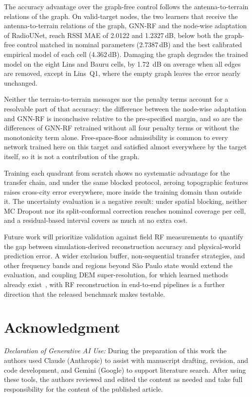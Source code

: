 \documentclass{ieeeaccess}
\begin{document}
The accuracy advantage over the graph-free control follows the antenna-to-terrain relations of the graph. On valid-target nodes, the two learners that receive the antenna-to-terrain relations of the graph, GNN-RF and the node-wise adaptation of RadioUNet, reach RSSI MAE of 2.0122 and 1.2327\,dB, below both the graph-free control matched in nominal parameters (2.7387\,dB) and the best calibrated empirical model of each cell (4.362\,dB). Damaging the graph degrades the trained model on the eight Lins and Bauru cells, by \SI{1.72}{\deci\bel} on average when all edges are removed, except in Lins~Q1, where the empty graph leaves the error nearly unchanged.

Neither the terrain-to-terrain messages nor the penalty terms account for a resolvable part of that accuracy: the difference between the node-wise adaptation and GNN-RF is inconclusive relative to the pre-specified margin, and so are the differences of GNN-RF retrained without all four penalty terms or without the monotonicity term alone. Free-space-floor admissibility is common to every network trained here on this target and satisfied almost everywhere by the target itself, so it is not a contribution of the graph.

Training each quadrant from scratch shows no systematic advantage for the transfer chain, and under the same blocked protocol, zeroing topographic features raises cross-city error everywhere, more inside the training domain than outside it. The uncertainty evaluation is a negative result: under spatial blocking, neither MC Dropout nor its split-conformal correction reaches nominal coverage per cell, and a residual-based interval covers as much at no extra cost.

Future work will prioritize validation against field RF measurements to quantify the gap between simulation-derived reconstruction accuracy and physical-world prediction error. A wider exclusion buffer, non-sequential transfer strategies, and other frequency bands and regions beyond S\~{a}o Paulo state would extend the evaluation, and coupling DEM super-resolution, for which learned methods already exist~\cite{guo2025multi,cai2025jspsr}, with RF reconstruction in end-to-end pipelines is a further direction that the released benchmark makes testable.


\section*{Acknowledgment}
\textit{Declaration of Generative AI Use:} During the preparation of this work the authors used Claude (Anthropic) to assist with manuscript drafting, revision, and code development, and Gemini (Google) to support literature search. After using these tools, the authors reviewed and edited the content as needed and take full responsibility for the content of the published article.
\end{document}
